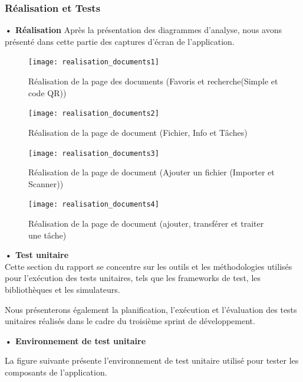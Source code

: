 \subsubsection{Réalisation et Tests}
\textbf{•	Réalisation }
Après la présentation des diagrammes d'analyse, nous avons présenté dans cette partie des captures d'écran de l'application.

\begin{figure}[H]
  \centering
  \texttt{[image: realisation\_documents1]}
  \caption{Réalisation de la page des documents (Favoris et recherche(Simple et code QR))}
  \label{fig:realisation_documents1}
\end{figure}

\begin{figure}[H]
  \centering
  \texttt{[image: realisation\_documents2]}
  \caption{Réalisation de la page de document (Fichier, Info et Tâches)}
  \label{fig:realisation_documents2}
\end{figure}

\begin{figure}[H]
  \centering
  \texttt{[image: realisation\_documents3]}
  \caption{Réalisation de la page de document (Ajouter un fichier (Importer et Scanner))}
  \label{fig:realisation_documents3}
\end{figure}

\begin{figure}[H]
  \centering
  \texttt{[image: realisation\_documents4]}
  \caption{Réalisation de la page de document (ajouter, transférer et traiter une tâche)}
  \label{fig:realisation_documents4}
\end{figure}

\textbf{•	Test unitaire} \\
Cette section du rapport se concentre sur les outils et les méthodologies utilisés pour l'exécution des tests unitaires, tels que les frameworks de test, les bibliothèques et les simulateurs.

Nous présenterons également la planification, l'exécution et l'évaluation des tests unitaires réalisés dans le cadre du troisième sprint de développement.

\textbf{•	Environnement de test unitaire}

La figure suivante présente l'environnement de test unitaire utilisé pour tester les composants de l'application.

